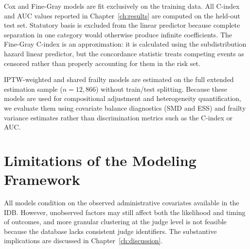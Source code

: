 Cox and Fine-Gray models are fit exclusively on the training
data. All C-index and AUC values reported in
Chapter~\ref{ch:results} are computed on the held-out test
set. Statutory basis is excluded from the linear predictor
because complete separation in one category would otherwise
produce infinite coefficients. The Fine-Gray C-index is an
approximation: it is calculated using the subdistribution
hazard linear predictor, but the concordance statistic treats
competing events as censored rather than properly accounting
for them in the risk set.

IPTW-weighted and shared frailty models are estimated on the
full extended estimation sample ($n = 12{,}866$) without
train/test splitting. Because these models are used for
compositional adjustment and heterogeneity quantification,
we evaluate them using covariate balance diagnostics
(SMD and ESS) and frailty variance estimates rather than
discrimination metrics such as the C-index or AUC.

\section{Limitations of the Modeling Framework}

All models condition on the observed administrative covariates available in the IDB. However, unobserved factors may still affect both the likelihood and timing of outcomes, and more granular clustering at the judge level is not feasible because the database lacks consistent judge identifiers. The substantive implications are discussed in Chapter~\ref{ch:discussion}.
